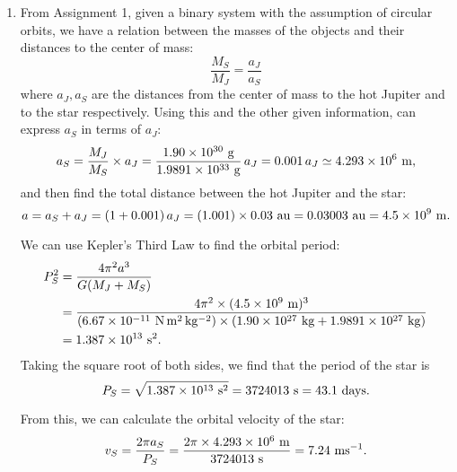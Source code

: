 \documentclass[11pt,letterpaper]{article}
\begin{document}
\begin{enumerate}[label=(\alph*)]
    \item From Assignment 1, given a binary system with the assumption of circular orbits, we have a relation between the masses of the objects and their distances to the center of mass:
        \begin{equation*}
            \frac{M_S}{M_J} = \frac{a_J}{a_S}
        \end{equation*}
        where $a_J, a_S$ are the distances from the center of mass to the hot Jupiter and to the star respectively. Using this and the other given information, can express $a_S$ in terms of $a_J$: 
        \begin{equation*}
            a_S = \frac{M_J}{M_S}\times a_J = \frac{1.90\times 10^{30}~{\rm g}}{1.9891\times 10^{33}~{\rm g}}\,a_J = 0.001\,a_J \simeq 4.293\times 10^{6}~{\rm m},
        \end{equation*}
        and then find the total distance between the hot Jupiter and the star: 
        \begin{equation*}
            a = a_S + a_J = (1+0.001)\,a_J = (1.001)\times 0.03~{\rm au} = 0.03003~{\rm au} = 4.5\times 10^{9}~{\rm m}.
        \end{equation*}

        We can use Kepler's Third Law to find the orbital period: 
        \begin{align*}
            P_S^2 &= \frac{4\pi^2 a^3}{G(M_J + M_S)} \\
                  &= \frac{4\pi^2\times (4.5\times 10^{9}~{\rm m})^3}{(6.67\times 10^{-11}~{\rm N\,m^2\,kg^{-2}})\times (1.90\times 10^{27}~{\rm kg} + 1.9891\times 10^{27}~{\rm kg})} \\
                  &= 1.387\times 10^{13}~{\rm s^2}.
        \end{align*}
        Taking the square root of both sides, we find that the period of the star is
        \begin{equation*}
            P_S = \sqrt{1.387\times 10^{13}~{\rm s^2}} = 3724013~{\rm s} = 43.1~{\rm days}.
        \end{equation*}

        From this, we can calculate the orbital velocity of the star:
        \begin{equation*}
            v_S = \frac{2\pi a_S}{P_S} = \frac{2\pi\times 4.293\times 10^{6}~{\rm m}}{3724013~{\rm s}} = 7.24~{\rm ms^{-1}}.
        \end{equation*}


\end{enumerate}
\end{document}
